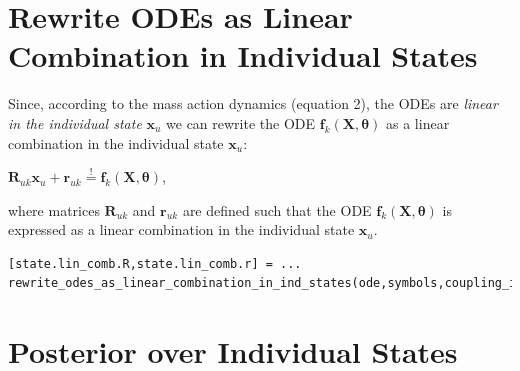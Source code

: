 \section{Rewrite ODEs as Linear Combination in Individual States}

\begin{par}
Since, according to the mass action dynamics (equation 2), the ODEs are \textit{linear in the individual state} $\mathbf{x}_u$ we can rewrite the ODE $\mathbf{f}_k(\mathbf{X},\boldsymbol\theta)$ as a linear combination in the individual state $\mathbf{x}_u$:
\end{par} \vspace{1em}
\begin{par}
$\mathbf{R}_{uk} \mathbf{x}_u + \mathbf{r}_{uk} \stackrel{!}{=}\mathbf{f}_k(\mathbf{X},\boldsymbol{\theta})$,
\end{par} \vspace{1em}
\begin{par}
where matrices  $\mathbf{R}_{uk}$ and  $\mathbf{r}_{uk}$ are defined such that the ODE $\mathbf{f}_k(\mathbf{X},\boldsymbol{\theta})$ is expressed as a linear combination in the individual state $\mathbf{x}_u$.
\end{par} \vspace{1em}
\color{RoyalPurple}\begin{verbatim}
[state.lin_comb.R,state.lin_comb.r] = ...
rewrite_odes_as_linear_combination_in_ind_states(ode,symbols,coupling_idx.states);
\end{verbatim}
\color{black}


\section{Posterior over Individual States}

